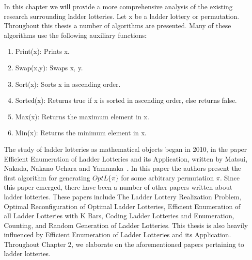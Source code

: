 
In this chapter we will provide a more comprehensive analysis of the existing research surrounding ladder lotteries. Let {\sc x} be 
a ladder lottery or permutation. 
Throughout this thesis a number of algorithms are presented. Many of these algorithms use the following auxiliary functions: 
\begin{enumerate}
    \item {\sc Print(x)}: Prints {\sc x}.
    \item {\sc Swap(x,y)}: Swaps {\sc x, y}.
    \item {\sc Sort(x)}: Sorts {\sc x} in ascending order.
    \item {\sc Sorted(x)}: Returns true if {\sc x} is sorted in ascending order, else returns false.
    \item {\sc Max(x)}: Returns the maximum element in {\sc x}.
    \item {\sc Min(x)}: Returns the minimum element in {\sc x}.
\end{enumerate}

The study of ladder lotteries as mathematical objects began in 2010, in the paper
Efficient Enumeration of Ladder Lotteries and its Application, written by Matsui, Nakada, Nakano Uehara and Yamanaka~\cite{A1}. 
In this paper the authors present the first algorithm for generating $OptL\{\pi\}$ for some  
arbitrary permutation $\pi$. Since this paper emerged, there have been 
a number of other papers written about ladder lotteries.
These papers include The Ladder Lottery Realization Problem,
Optimal Reconfiguration of Optimal Ladder Lotteries, 
Efficient Enumeration of all Ladder Lotteries with K Bars,
Coding Ladder Lotteries and
Enumeration, Counting, and Random Generation of Ladder Lotteries.
This thesis is also heavily influenced by Efficient Enumeration of Ladder Lotteries and its Application. Throughout Chapter 2, 
we elaborate on the aforementioned papers pertaining to ladder lotteries.

